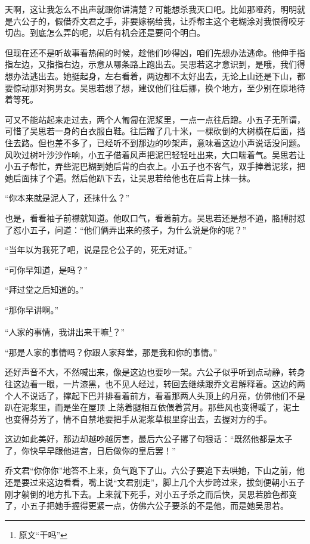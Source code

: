 天啊，这让我怎么不出声就跟你讲清楚？可能想杀我灭口吧。比如那哑药，明明就是六公子的，假借乔文君之手，非要嫁祸给我，让乔帮主这个老糊涂对我恨得咬牙切齿。到底怎么弄的呢，以后有机会还是要问个明白。

但现在还不是听故事看热闹的时候，趁他们吵得凶，咱们先想办法逃命。他伸手指指左边，又指指右边，示意从哪条路上跑出去。吴思若这才意识到，是哦，我们得想办法逃出去。她挺起身，左右看着，两边都不太好出去，无论上山还是下山，都要惊动那对狗男女。吴思若想了想，建议他们往后挪，换个地方，至少别在原地待着等死。

可又不能站起来走过去，两个人匍匐在泥浆里，一点一点往后蹭。小五子无所谓，可惜了吴思若一身的白衣服白鞋。往后蹭了几十米，一棵砍倒的大树横在后面，挡住去路。但也差不多了，已经听不到那边的吵架声，意味着这边小声说话没问题。风吹过树叶沙沙作响，小五子借着风声把泥巴轻轻吐出来，大口喘着气。吴思若让小五子帮忙，弄些泥巴糊到她后背的白衣上。小五子也不客气，双手捧着泥浆，把她后面抹了个遍。然后他趴下去，让吴思若给他也在后背上抹一抹。

“你本来就是泥人了，还抹什么？”

也是，看看袖子前襟就知道。他叹口气，看着前方。吴思若还是想不通，胳膊肘怼了怼小五子，问道：“他们俩弄出来的孩子，为什么说是你的呢？”

“当年以为我死了吧，说是昆仑公子的，死无对证。”

“可你早知道，是吗？”

“拜过堂之后知道的。”

“那你早讲啊。”

“人家的事情，我讲出来干嘛\footnote{原文“干吗”}？”

“那是人家的事情吗？你跟人家拜堂，那是我和你的事情。”

还好声音不大，不然喊出来，像是这边也要吵一架。六公子似乎听到点动静，转身往这边看一眼，一片漆黑，也不见人经过，转回去继续跟乔文君解释着。这边的两个人不说话了，撑起下巴并排看着前方，看着那两人头顶上的月亮，仿佛他们不是趴在泥浆里，而是坐在屋顶
上荡着腿相互依偎着赏月。那些风也变得暖了，泥土也变得芬芳了，情不自禁地要把手从泥浆草根里穿出去，去握对方的手。

这边如此美好，那边却越吵越厉害，最后六公子撂了句狠话：“既然他都是太子了，你快早早跟他进宫，日后做你的皇后罢！”

乔文君“你你你”地答不上来，负气跑下了山。六公子要追下去哄她，下山之前，他还是要过来这边看看，嘴上说“文君别走”，脚上几个大步跨过来，拔剑便朝小五子刚才躺倒的地方扎下去。上来就下死手，对小五子杀之而后快，吴思若脸色都变了，小五子把她手握得更紧一点，仿佛六公子要杀的不是他，而是她吴思若。

